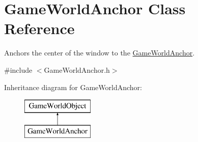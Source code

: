\hypertarget{class_game_world_anchor}{}\section{Game\+World\+Anchor Class Reference}
\label{class_game_world_anchor}


Anchors the center of the window to the \hyperlink{class_game_world_anchor}{Game\+World\+Anchor}.  




{\ttfamily \#include $<$Game\+World\+Anchor.\+h$>$}

Inheritance diagram for Game\+World\+Anchor\+:\begin{figure}[H]
\begin{center}
\leavevmode
\includegraphics[height=2.000000cm]{class_game_world_anchor}
\end{center}
\end{figure}
